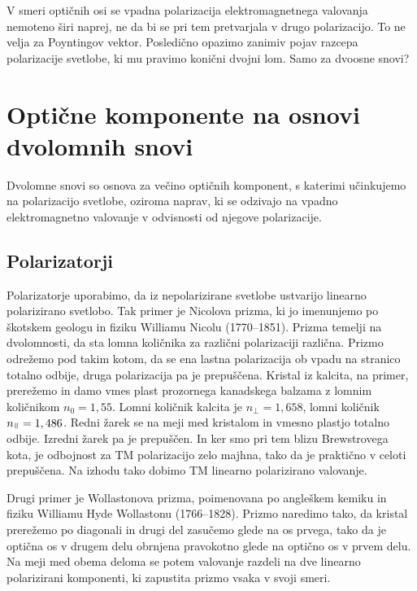 V smeri optičnih osi se vpadna polarizacija elektromagnetnega valovanja nemoteno širi naprej,
ne da bi se pri tem pretvarjala v drugo polarizacijo. To ne velja za Poyntingov vektor. Posledično
opazimo zanimiv pojav razcepa polarizacije svetlobe, ki mu pravimo konični dvojni lom. Samo za dvoosne snovi?

\section{Optične komponente na osnovi dvolomnih snovi}
Dvolomne snovi so osnova za večino optičnih komponent, s katerimi učinkujemo na polarizacijo
svetlobe, oziroma naprav, ki se odzivajo na vpadno elektromagnetno valovanje v odvisnosti
od njegove polarizacije.

\subsection*{Polarizatorji}
Polarizatorje uporabimo, da iz nepolarizirane svetlobe ustvarijo  linearno polarizirano 
svetlobo. Tak primer je Nicolova prizma, ki jo imenunjemo po škotskem geologu in fiziku
Williamu Nicolu (1770--1851). Prizma temelji na dvolomnosti, da sta lomna količnika za 
različni polarizaciji različna. Prizmo odrežemo pod takim kotom, da se ena lastna polarizacija
ob vpadu na stranico totalno odbije, druga polarizacija pa je prepuščena. Kristal iz kalcita, 
na primer, prerežemo in damo vmes plast prozornega kanadskega balzama z lomnim
količnikom $n_0=1,55$.  Lomni količnik kalcita je $n_\perp = 1,658$, lomni količnik
$n_\myparallel = 1,486$. Redni žarek se na meji med kristalom in vmesno plastjo 
totalno odbije. Izredni žarek pa je prepuščen. In ker smo pri tem blizu Brewstrovega kota,
je odbojnost za TM polarizacijo zelo majhna, tako da je praktično v celoti prepuščena. Na izhodu
tako dobimo TM linearno polarizirano valovanje. 

Drugi primer je Wollastonova prizma, poimenovana po angleškem kemiku in fiziku 
Williamu Hyde Wollastonu (1766--1828). Prizmo naredimo tako, da kristal prerežemo po 
diagonali in drugi del zasučemo glede na os prvega, tako da je optična os v drugem delu
obrnjena pravokotno glede na optično os v prvem delu. Na meji med obema deloma se potem 
valovanje razdeli na dve linearno polarizirani komponenti, ki zapustita prizmo vsaka v svoji
smeri. 

